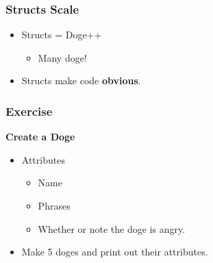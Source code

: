\documentclass{beamer}
\begin{document}
\begin{frame}[fragile]
  \frametitle{Structs Scale}

  \begin{itemize}
    \item Structs = Doge++
      \begin{itemize}
        \item Many doge!
      \end{itemize}
    \item Structs make code \textbf{obvious}.
  \end{itemize}
\end{frame}

\begin{frame}
  \frametitle{Exercise}

  \textbf{Create a Doge}

  \begin{itemize}
    \item Attributes
      \begin{itemize}
        \item Name
        \item Phrases
        \item Whether or note the doge is angry.
      \end{itemize}
    \item Make 5 doges and print out their attributes.
  \end{itemize}
\end{frame}
\end{document}
